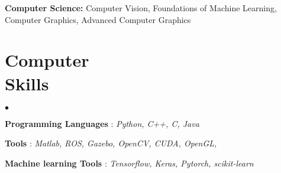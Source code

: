 \documentclass[margin,line]{res}
\newenvironment{list2}{
  \begin{list}{$\bullet$}{%
      \setlength{\itemsep}{0in}
      \setlength{\parsep}{0in} \setlength{\parskip}{0in}
      \setlength{\topsep}{0in} \setlength{\partopsep}{0in} 
      \setlength{\leftmargin}{0.2in}}}{\end{list}}
\begin{document}
\begin{resume}
\textbf{Computer Science:} Computer Vision, Foundations of Machine Learning, Computer Graphics, Advanced Computer Graphics 
\section{\sc Computer\\ Skills} 
\begin{list2}
\item \textbf{Programming Languages} : \textit{Python, C++, C, Java}
\item \textbf{Tools} : \textit{Matlab, ROS, Gazebo, OpenCV, CUDA, OpenGL, }
\item \textbf{Machine learning Tools} : \textit{Tensorflow, Keras, Pytorch, scikit-learn}

\end{list2}



%
%				

\end{resume}
\end{document}
